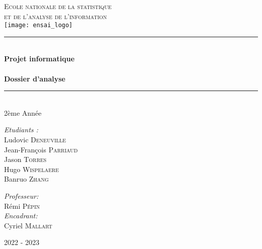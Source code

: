\documentclass[11pt]{article}
\newcommand{\HRule}{\rule{\linewidth}{0.5mm}}
\begin{document}

\begin{titlepage}
\begin{center}


\textsc{{\LARGE Ecole nationale de la statistique \\et de l'analyse de l'information}} \\ %
\vspace{5mm}
\texttt{[image: ensai\_logo]}\\[2 cm] %



\HRule \\[0.4cm]
{ \huge \bfseries Projet informatique \\ \ \\ Dossier d'analyse}\\[0.4cm]

\HRule \\[1cm]

{\Large 2ème Année}\\ [2cm]


\begin{flushleft} \Large
\emph{Etudiants :}\\
Ludovic \textsc{Deneuville} \\
Jean-François \textsc{Parriaud} \\
Jason \textsc{Torres} \\
Hugo \textsc{Wispelaere} \\
Banruo \textsc{Zhang} \\
\end{flushleft}

\begin{flushright} \Large
\emph{Professeur:} \\
Rémi \textsc{Pépin} \\
\emph{Encadrant:} \\
Cyriel \textsc{Mallart} \\
\end{flushright}


\vfill
{\large 2022 - 2023}
\end{center}
\end{titlepage} 
\end{document}
